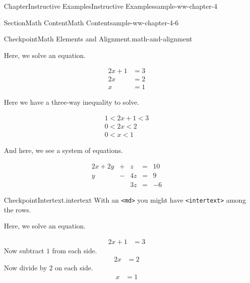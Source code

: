 \documentclass[oneside,10pt,]{book}
\newcommand{\mono}[1]{\texttt{#1}}
\numberwithin{equation}{section}
\newcommand{\lt}{<}
\newcommand{\amp}{&}
\begin{document}
\begin{chapterptx}{Chapter}{Instructive Examples}{}{Instructive Examples}{}{}{sample-ww-chapter-4}
\begin{sectionptx}{Section}{Math Content}{}{Math Content}{}{}{sample-ww-chapter-4-6}
\begin{inlineexercise}{Checkpoint}{Math Elements and Alignment.}{math-and-alignment}
%
\par
Here, we solve an equation.%
\par
%
\begin{equation*}
\begin{aligned}
2x+1 \amp= 3\\
2x   \amp= 2\\
x    \amp= 1
\end{aligned}
\end{equation*}
%
\par
Here we have a three-way inequality to solve.%
\par
%
\begin{equation*}
\begin{gathered}
1 \lt 2x+1 \lt 3\\
0 \lt 2x   \lt 2\\
0 \lt x    \lt 1
\end{gathered}
\end{equation*}
%
\par
And here, we see a system of equations.%
\par
%
\begin{equation*}
\begin{alignedat}{3}
2x + 2y \amp {}+{} \amp z \amp {}={} \amp 10\\
y \amp {}-{} \amp  4z \amp {}={} \amp 9\\
\amp\amp   3z \amp {}={} \amp -6
\end{alignedat}
\end{equation*}
%
\end{inlineexercise}%
\begin{inlineexercise}{Checkpoint}{Intertext.}{intertext}%
With an \mono{<md>} you might have \mono{<intertext>} among the rows.%
\par
Here, we solve an equation.%
\par
%
\begin{equation*}
\begin{aligned}
2x+1 \amp= 3
\end{aligned}
\end{equation*}
Now subtract \(1\) from each side.%
\begin{equation*}
\begin{aligned}
2x   \amp= 2
\end{aligned}
\end{equation*}
Now divide by \(2\) on each side.%
\begin{equation*}
\begin{aligned}
x    \amp= 1
\end{aligned}

\end{equation*}
\end{inlineexercise}
\end{sectionptx}
\end{chapterptx}
\end{document}
